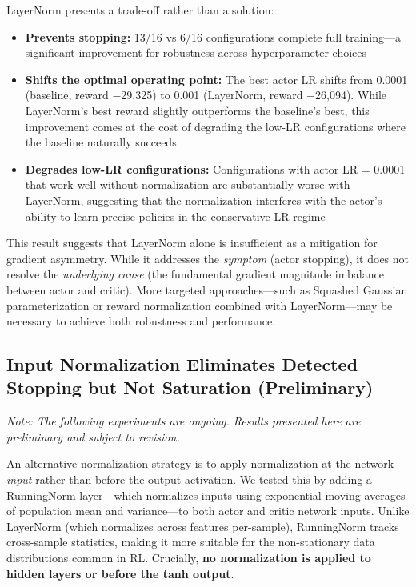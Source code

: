 LayerNorm presents a trade-off rather than a solution:
\begin{itemize}
    \item \textbf{Prevents stopping:} 13/16 vs 6/16 configurations complete full training---a significant improvement for robustness across hyperparameter choices
    \item \textbf{Shifts the optimal operating point:} The best actor LR shifts from 0.0001 (baseline, reward $-$29,325) to 0.001 (LayerNorm, reward $-$26,094). While LayerNorm's best reward slightly outperforms the baseline's best, this improvement comes at the cost of degrading the low-LR configurations where the baseline naturally succeeds
    \item \textbf{Degrades low-LR configurations:} Configurations with actor LR = 0.0001 that work well without normalization are substantially worse with LayerNorm, suggesting that the normalization interferes with the actor's ability to learn precise policies in the conservative-LR regime
\end{itemize}

This result suggests that LayerNorm alone is insufficient as a mitigation for gradient asymmetry. While it addresses the \textit{symptom} (actor stopping), it does not resolve the \textit{underlying cause} (the fundamental gradient magnitude imbalance between actor and critic). More targeted approaches---such as Squashed Gaussian parameterization or reward normalization combined with LayerNorm---may be necessary to achieve both robustness and performance.

\subsection{Input Normalization Eliminates Detected Stopping but Not Saturation (Preliminary)}

\textit{Note: The following experiments are ongoing. Results presented here are preliminary and subject to revision.}

An alternative normalization strategy is to apply normalization at the network \textit{input} rather than before the output activation. We tested this by adding a RunningNorm layer---which normalizes inputs using exponential moving averages of population mean and variance---to both actor and critic network inputs. Unlike LayerNorm (which normalizes across features per-sample), RunningNorm tracks cross-sample statistics, making it more suitable for the non-stationary data distributions common in RL. Crucially, \textbf{no normalization is applied to hidden layers or before the tanh output}.

